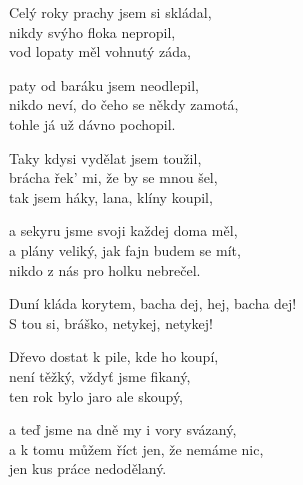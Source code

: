 
\ve{}
Celý roky prachy jsem si skládal,\\
nikdy svýho floka nepropil,\\
vod lopaty měl vohnutý záda,

paty od baráku jsem neodlepil,\\
nikdo neví, do čeho se někdy zamotá,\\
tohle já už dávno pochopil.

\ve{}
Taky kdysi vydělat jsem toužil,\\
brácha řek' mi, že by se mnou šel,\\
tak jsem háky, lana, klíny koupil,

a sekyru jsme svoji každej doma měl,\\
a plány veliký, jak fajn budem se mít,\\
nikdo z nás pro holku nebrečel.

\cho{}
Duní kláda korytem, bacha dej, hej, bacha dej!\\
S tou si, bráško, netykej, netykej!

\ve{} 
Dřevo dostat k pile, kde ho koupí,\\
není těžký, vždyť jsme fikaný,\\
ten rok bylo jaro ale skoupý,

a teď jsme na dně my i vory svázaný,\\
a k tomu můžem říct jen, že nemáme nic,\\
jen kus práce nedodělaný.

\esong{}
